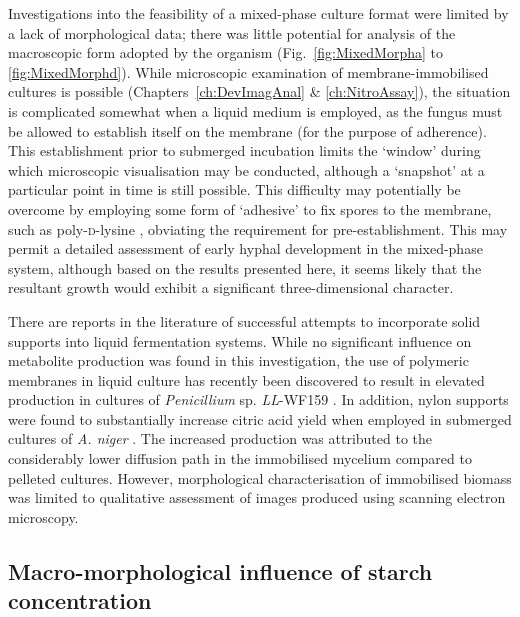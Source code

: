 Investigations into the feasibility of a mixed-phase culture format were limited by a lack of morphological data; there was little potential for analysis of the macroscopic form adopted by the organism (Fig.~\ref{fig:MixedMorpha} to \ref{fig:MixedMorphd}). While microscopic examination of membrane-immobilised cultures is possible (Chapters~\ref{ch:DevImagAnal} \& \ref{ch:NitroAssay}), the situation is complicated somewhat when a liquid medium is employed, as the fungus must be allowed to establish itself on the membrane (for the purpose of adherence). This establishment prior to submerged incubation limits the \lq window' during which microscopic visualisation may be conducted, although a \lq snapshot' at a particular point in time is still possible. This difficulty may potentially be overcome by employing some form of \lq adhesive' to fix spores to the membrane, such as poly-{\scshape d}-lysine \cite{spohr1998}, obviating the requirement for pre-establishment. This may permit a detailed assessment of early hyphal development in the mixed-phase system, although based on the results presented here, it seems likely that the resultant growth would exhibit a significant three-dimensional character.

There are reports in the literature of successful attempts to incorporate solid supports into liquid fermentation systems. While no significant influence on metabolite production was found in this investigation, the use of polymeric membranes in liquid culture has recently been discovered to result in elevated production in cultures of \emph{Penicillium} sp. \emph{LL}-WF159 \cite{bigelis2006}. In addition, nylon supports were found to substantially increase citric acid yield when employed in submerged cultures of \emph{A. niger} \cite{papagianni2004}. The increased production was attributed to the considerably lower diffusion path in the immobilised mycelium compared to pelleted cultures. However, morphological characterisation of immobilised biomass was limited to qualitative assessment of images produced using scanning electron microscopy.

\subsection{Macro-morphological influence of starch concentration}


